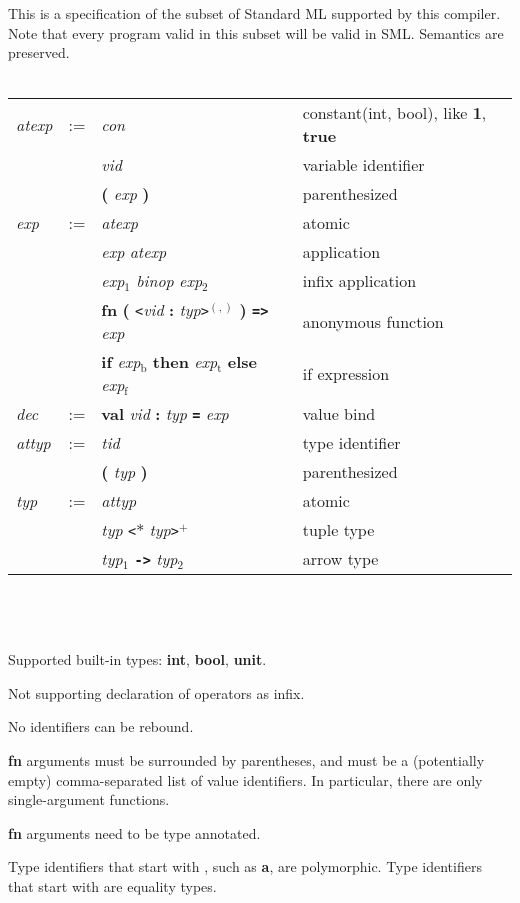 \documentclass[12pt]{article}
\author{Andrey Yao}
\newcommand{\gm}[1]{\textit{#1}} %
\newcommand{\kw}[1]{\textbf{#1}} %
\newcommand{\hd}[1]{ \gm{#1} & := }
\newcommand{\row}[2]{ & #1 &  & #2\\}
\newcommand{\newrow}[2]{ & &#1 & &#2\\}
\begin{document}
This is a specification of the subset of Standard ML supported by this compiler. Note that every program valid in this subset will be valid in SML. Semantics are preserved.
\\\\
\begin{tabular}{l l l l l}
  \hline %
  \hd{atexp}
  \row{\gm{con}}{constant(int, bool), like \kw{1}, \kw{true} }
  \newrow{\gm{vid}}{variable identifier}
  \newrow{\kw{(} \gm{exp} \kw{)}}{parenthesized}
  \hd{exp}
  \row{\gm{atexp}}{atomic}
  \newrow{\gm{exp} \gm{atexp}}{application}
  \newrow{\gm{exp}$_1$ \gm{binop} \gm{exp}$_2$}{infix application}
  \newrow{\kw{fn} \kw{(} \texttt{<}\gm{vid} \kw{:} \gm{typ}\texttt{>}$^{(,)}$ \kw{)} \kw{\texttt{=>}} \gm{exp}}{anonymous function}
  \newrow{\kw{if} \gm{exp}$_\text{b}$ \kw{then} \gm{exp}$_\text{t}$ \kw{else} \gm{exp}$_\text{f}$}{if expression}
  \hd{dec}
  \row{\kw{val} \gm{vid} \kw{:} \gm{typ} \kw{\texttt{=}} \gm{exp}}{value bind}
  \hline %
  \hd{attyp}
  \row{\gm{tid}}{type identifier}
  \newrow{\kw{(} \gm{typ} \kw{)}}{parenthesized}
  \hd{typ}
  \row{\gm{attyp}}{atomic}
  \newrow{\gm{typ} \texttt{<}{\bf$*$} \gm{typ}\texttt{>}$^+$}{tuple type}
  \newrow{\gm{typ}$_1$ \kw{\texttt{->}} \gm{typ}$_2$}{arrow type}
\end{tabular}
\\\\\\

Supported built-in types: \kw{int}, \kw{bool}, \kw{unit}.

Not supporting declaration of operators as infix.

No identifiers can be rebound.

\kw{fn} arguments must be surrounded by parentheses, and must be a (potentially empty) comma-separated list of value identifiers. In particular, there are only single-argument functions.

\kw{fn} arguments need to be type annotated.

Type identifiers that start with \kw{\textquotesingle}, such as \kw{\textquotesingle a}, are polymorphic. Type identifiers that start with \kw{\textquotesingle\textquotesingle} are equality types.
\end{document}
